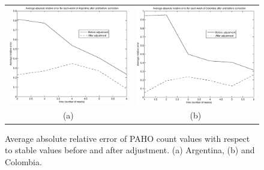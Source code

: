 \begin{figure}[h]
  \centering
   \begin{tabular}{cc}
     \includegraphics[width=.45\textwidth]{fig/forPaper_absscorePerWeekAfterCorrection_avgsOfWeeks_Argentina.eps} &
     \includegraphics[width=.45\textwidth]{fig/forPaper_absscorePerWeekAfterCorrection_avgsOfWeeks_Colombia.eps} \\
      (a) & (b) \\ %
  \end{tabular}
  \caption{Average absolute relative error of PAHO count values with respect to stable values before and after adjustment.
  (a) Argentina,
  (b) and Colombia.
  }
  \label{fig:adjustedrelerrors}

\end{figure}



